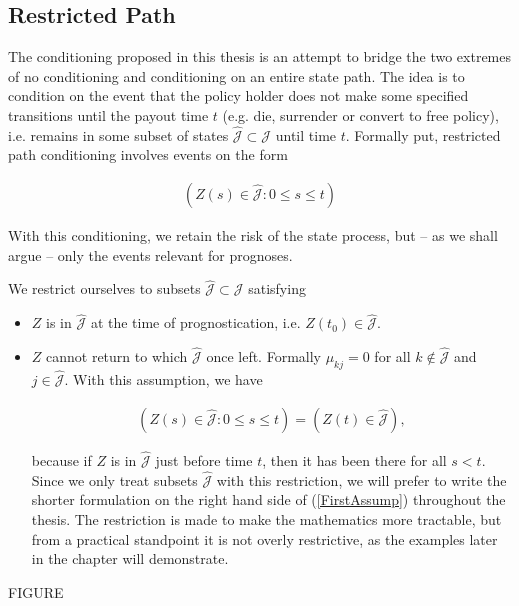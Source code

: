 \documentclass{book}
\newcommand{\1}[1]{\mathbbm{1}_{\left\lbrace #1 \right\rbrace}}
\theoremstyle{break}
\theoremstyle{remark}
\numberwithin{equation}{section}
\begin{document}
\subsection{Restricted Path}

The conditioning proposed in this thesis is an attempt to bridge the two extremes of no conditioning and conditioning on an entire state path. The idea is to condition on the event that the policy holder does not make some specified transitions until the payout time $t$ (e.g. die, surrender or convert to free policy), i.e. remains in some subset of states $\hat{\mathcal{J}} \subset \mathcal{J}$ until time $t$. Formally put, restricted path conditioning involves events on the form

\begin{align} \label{FirstCond}
	\left( Z(s) \in \hat{\mathcal{J}} : 0 \leq s \leq t \right)
\end{align}

With this conditioning, we retain the risk of the state process, but -- as we shall argue -- only the events relevant for prognoses.

We restrict ourselves to subsets $\hat{\mathcal{J}} \subset \mathcal{J}$ satisfying

\begin{itemize}
	\item $Z$ is in $\hat{\mathcal{J}}$ at the time of prognostication, i.e. $Z(t_0) \in \hat{\mathcal{J}}$.
	\item $Z$ cannot return to which $\hat{\mathcal{J}}$ once left. Formally $\mu_{kj} = 0$ for all $k \notin \hat{\mathcal{J}}$ and $j \in \hat{\mathcal{J}}$. With this assumption, we have
	
	\begin{align} \label{FirstAssump}
		\left( Z(s) \in \hat{\mathcal{J}} : 0 \leq s \leq t \right) = \left( Z(t) \in \hat{\mathcal{J}} \right),
	\end{align}
	
	because if $Z$ is in $\hat{\mathcal{J}}$ just before time $t$, then it has been there for all $s < t$. Since we only treat subsets $\hat{\mathcal{J}}$ with this restriction, we will prefer to write the shorter formulation on the right hand side of (\ref{FirstAssump}) throughout the thesis. The restriction is made to make the mathematics more tractable, but from a practical standpoint it is not overly restrictive, as the examples later in the chapter will demonstrate. 
\end{itemize}


FIGURE
\end{document}
